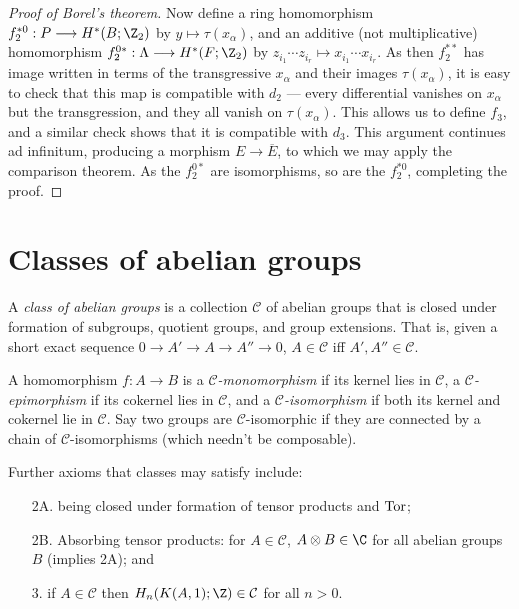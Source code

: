 \documentclass[11pt]{article}
\newcommand{\Tor}{\textup{Tor}}
\theoremstyle{plain}
\theoremstyle{definition}
\renewcommand{\to}{\longrightarrow}
\renewcommand{\mapsto}{\longmapsto}
\newcommand{\SerreClass}{\mathcal{C}}
\newcommand{\squishlist}{
  \setlength{\itemsep}{1pt}
  \setlength{\parskip}{0pt}
  \setlength{\parsep}{0pt}
}
\begin{document}
\begin{proof}[Proof of Borel's theorem]
Now define a ring homomorphism $f_2^{*0}:P\to H^*(B;\Z_2)$ by $y\mapsto \tau(x_\alpha)$, and an additive (not multiplicative) homomorphism $f_2^{0*}:\Lambda\to H^*(F;\Z_2)$ by $z_{i_1}\cdots z_{i_r}\mapsto x_{i_1}\cdots x_{i_r}$. As then $f_2^{**}$ has image written in terms of the transgressive $x_\alpha$ and their images $\tau(x_\alpha)$, it is easy to check that this map is compatible with $d_2$ --- every differential vanishes on $x_\alpha$ but the transgression, and they all vanish on $\tau(x_\alpha)$. This allows us to define $f_3$, and a similar check shows that it is compatible with $d_3$. This argument continues ad infinitum, producing a morphism $E\to\overline E$, to which we may apply the comparison theorem. As the $f_2^{0*}$ are isomorphisms, so are the $f_2^{*0}$, completing the proof.
%
%
\end{proof}

\section{Classes of abelian groups}
A \emph{class of abelian groups} is a collection $\SerreClass$ of abelian groups that is closed under formation of subgroups, quotient groups, and group extensions. That is, given a short exact sequence $0\to A'\to A\to A''\to0$, $A\in\SerreClass$ iff $A',A''\in\SerreClass$.

A homomorphism $f:A\to B$ is a \emph{$\SerreClass$-monomorphism} if its kernel lies in $\SerreClass$, a \emph{$\SerreClass$-epimorphism} if its cokernel lies in $\SerreClass$, and a \emph{$\SerreClass$-isomorphism} if both its kernel and cokernel lie in $\SerreClass$. Say two groups are $\SerreClass$-isomorphic if they are connected by a chain of $\SerreClass$-isomorphisms (which needn't be composable).

Further axioms that classes may satisfy include:
\begin{itemize}
\squishlist
\item[2A.] being closed under formation of tensor products and $\Tor$;
\item[2B.] Absorbing tensor products: for $A\in\SerreClass$, $A\otimes B\in\C$ for all abelian groups $B$ (implies 2A); and
\item[3.] if $A\in\SerreClass$ then $H_n(K(A,1);\Z)\in\SerreClass$ for all $n>0$.
\end{itemize}
\end{document}
